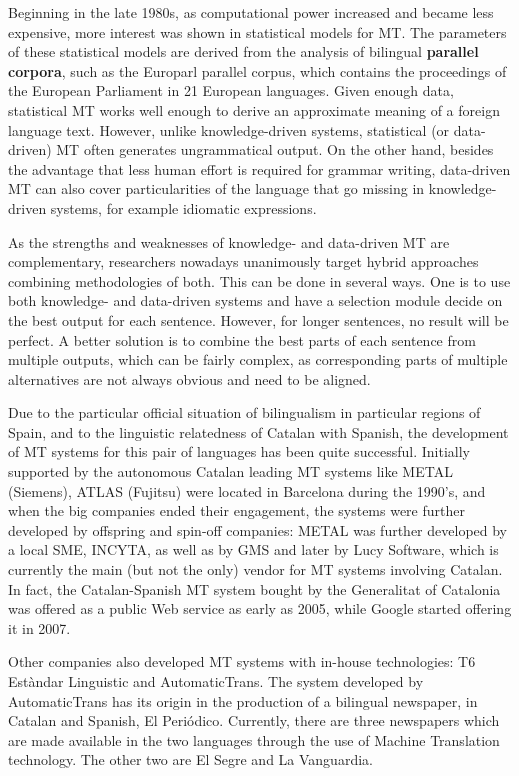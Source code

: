 \begin{multicols}{2}
Beginning in the late 1980s, as computational power increased and became less expensive, more interest was shown in statistical models for MT. The parameters of these statistical models are derived from the analysis of bilingual \textbf{parallel corpora}, such as the Europarl parallel corpus, which contains the proceedings of the European Parliament in 21 European languages. Given enough data, statistical MT works well enough to derive an approximate meaning of a foreign language text. However, unlike knowledge-driven systems, statistical (or data-driven) MT often generates ungrammatical output. On the other hand, besides the advantage that less human effort is required for grammar writing, data-driven MT can also cover particularities of the language that go missing in knowledge-driven systems, for example idiomatic expressions. 

As the strengths and weaknesses of knowledge- and data-driven MT are complementary, researchers nowadays unanimously target hybrid approaches combining methodologies of both. This can be done in several ways. One is to use both knowledge- and data-driven systems and have a selection module decide on the best output for each sentence. However, for longer sentences, no result will be perfect. A better solution is to combine the best parts of each sentence from multiple outputs, which can be fairly complex, as corresponding parts of multiple alternatives are not always obvious and need to be aligned. 

Due to the particular official situation of bilingualism in particular regions of Spain, and to the linguistic relatedness of Catalan with Spanish, the development of MT systems for this pair of languages has been quite successful. Initially supported by the autonomous Catalan leading MT systems like METAL (Siemens), ATLAS (Fujitsu) were located in Barcelona during the 1990’s, and when the big companies ended their engagement, the systems were further developed by offspring and spin-off companies: METAL was further developed by a local SME, INCYTA, as well as by GMS and later by Lucy Software, which is currently the main (but not the only) vendor for MT systems involving Catalan. In fact, the Catalan-Spanish MT system  bought by the Generalitat of Catalonia was offered as a public Web service as early as 2005, while Google started offering it in 2007. 

Other companies also developed MT systems with in-house technologies: T6 Estàndar Linguistic and AutomaticTrans. The system developed by AutomaticTrans has its origin in the production of a bilingual newspaper, in Catalan and Spanish, El Periódico. Currently, there are three newspapers which are made available in the two languages  through the use of Machine Translation technology. The other two are El Segre and La Vanguardia. 


\end{multicols}
